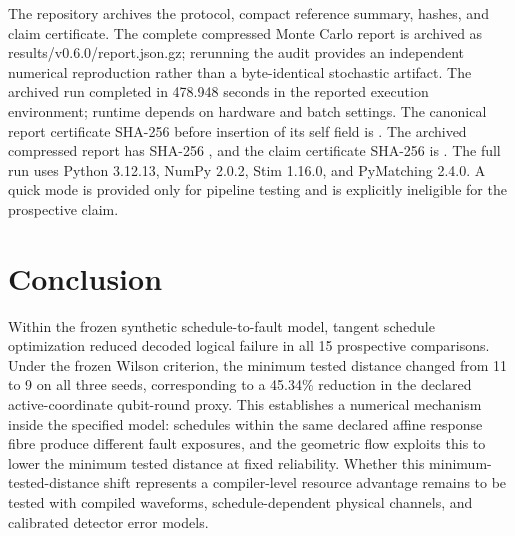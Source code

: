 \documentclass[11pt]{article}
\begin{document}
The repository archives the protocol, compact reference summary, hashes, and claim certificate. The complete compressed Monte Carlo report is archived as results/v0.6.0/report.json.gz; rerunning the audit provides an independent numerical reproduction rather than a byte-identical stochastic artifact. The archived run completed in 478.948 seconds in the reported execution environment; runtime depends on hardware and batch settings. The canonical report certificate SHA-256 before insertion of its self field is
.
The archived compressed report has SHA-256
,
and the claim certificate SHA-256 is
.
The full run uses Python 3.12.13, NumPy 2.0.2, Stim 1.16.0, and PyMatching 2.4.0. A quick mode is provided only for pipeline testing and is explicitly ineligible for the prospective claim.

\section{Conclusion}

Within the frozen synthetic schedule-to-fault model, tangent schedule optimization reduced decoded logical failure in all 15 prospective comparisons. Under the frozen Wilson criterion, the minimum tested distance changed from 11 to 9 on all three seeds, corresponding to a 45.34\% reduction in the declared active-coordinate qubit-round proxy. This establishes a numerical mechanism inside the specified model: schedules within the same declared affine response fibre produce different fault exposures, and the geometric flow exploits this to lower the minimum tested distance at fixed reliability. Whether this minimum-tested-distance shift represents a compiler-level resource advantage remains to be tested with compiled waveforms, schedule-dependent physical channels, and calibrated detector error models.
\end{document}
